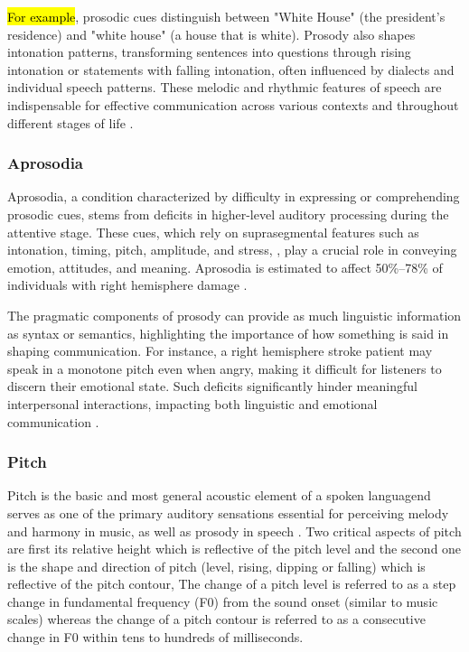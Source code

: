 \hl{For example}, prosodic cues distinguish between "White House" (the president's residence) and "white house" (a house that is white). Prosody also shapes intonation patterns, transforming sentences into questions through rising intonation or statements with falling intonation, often influenced by dialects and individual speech patterns. These melodic and rhythmic features of speech are indispensable for effective communication across various contexts and throughout different stages of life \cite{belyk_perception_2014}.

\subsubsection{Aprosodia}
Aprosodia, a condition characterized by difficulty in expressing or comprehending prosodic cues, stems from deficits in higher-level auditory processing during the attentive stage. These cues, which rely on suprasegmental features such as intonation, timing, pitch, amplitude, and stress\cite{ross_lateralization_1997}, \cite{gorelick_aprosodias_1987}, play a crucial role in conveying emotion, attitudes, and meaning. Aprosodia is estimated to affect 50\%–78\% of individuals with right hemisphere damage \cite{benton_right_1996} \cite{cancelliere_lesion_1990}\cite{cote_towards_2007}. \cite{ukaegbe_aprosodia_2022}

The pragmatic components of prosody can provide as much linguistic information as syntax or semantics, highlighting the importance of how something is said in shaping communication. For instance, a right hemisphere stroke patient may speak in a monotone pitch even when angry, making it difficult for listeners to discern their emotional state. Such deficits significantly hinder meaningful interpersonal interactions, impacting both linguistic and emotional communication \cite{gajardo-vidal_how_2018} \cite{sheppard_thats_2018}.

\subsubsection{Pitch}
Pitch is the basic and most general acoustic element of a spoken languagend serves as one of the primary auditory sensations essential for perceiving melody and harmony in music, as well as prosody in speech \cite{plack_pitch_2005}. Two critical aspects of pitch are first its relative height  which is reflective of the pitch level and the second one is the shape and direction of pitch (level, rising, dipping or falling) which is reflective of the pitch contour, The change of a pitch level is referred to as a step change in fundamental frequency (F0) from the sound onset (similar to music scales) whereas the change of a pitch contour is referred to as a consecutive change in F0 within tens to hundreds of milliseconds\cite{wang_hemispheric_2013}.


